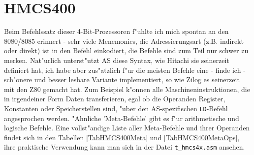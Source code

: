 \documentclass[12pt,a4paper,twoside]{report}
\newcommand{\tty}[1]{{\tt #1}}
\begin{document}

\section{HMCS400}

Beim Befehlssatz dieser 4-Bit-Prozessoren f"uhlte ich mich
spontan an den 8080/8085 erinnert - sehr viele Menemonics, die
Adressierungsart (z.B.  indirekt oder direkt) ist in den Befehl
einkodiert, die Befehle sind zum Teil nur schwer zu merken.
Nat"urlich unterst"utzt AS diese Syntax, wie Hitachi sie
seinerzeit definiert hat, ich habe aber zus"atzlich f"ur die
meisten Befehle eine - finde ich - sch"onere und besser lesbare
Variante implementiert, so wie Zilog es seinerzeit mit den Z80
gemacht hat.  Zum Beispiel k"onnen alle Maschineninstruktionen,
die in irgendeiner Form Daten transferieren, egal ob die
Operanden Register, Konstanten oder Speicherstellen sind, "uber den
AS-spezifischen \tty{LD}-Befehl angesprochen werden.  "Ahnliche
'Meta-Befehle' gibt es f"ur arithmetische und logische Befehle.
Eine vollst"andige Liste aller Meta-Befehle und ihrer Operanden
findet sich in den Tabellen \ref{TabHMCS400Meta} und
\ref{TabHMCS400MetaOps}, ihre praktische Verwendung kann man sich
in der Datei \tty{t\_hmcs4x.asm} ansehen.
\end{document}
